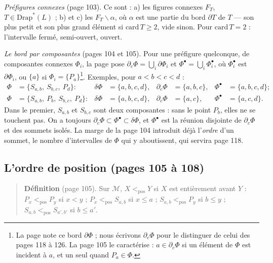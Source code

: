 \documentclass[11pt,a4paper]{article}
\begin{document}
\emph{Préfigures connexes} (page 103). Ce sont : a) les figures connexes
$F_{T}$, $T \in \mathrm{Drap}^{*}(L)$ ; b) et c) les $F_{T} \smallsetminus
\alpha$, où $\alpha$ est une partie du bord $\partial T$ de $T$ --- son plus
petit et son plus grand élément si $\mathrm{card}\, T \geq 2$, vide sinon.
Pour $\mathrm{card}\, T = 2$ : l'intervalle fermé, semi-ouvert, ouvert.

\emph{Le bord par composantes} (pages 104 et 105). Pour une préfigure
quelconque, de composantes connexes $\Phi_{i}$, la page pose $\partial_{c}\Phi
= \bigcup_{i} \partial\Phi_{i}$ et $\Phi^{\bullet} = \bigcup_{i}
\Phi_{i}^{\bullet}$, où $\Phi_{i}^{\bullet}$ est $\partial\Phi_{i}$, ou $\{a\}$
si $\Phi_{i} = \{P_{a}\}$\footnote{La page note ce bord $\partial\Phi$ ; nous
écrivons $\partial_{c}\Phi$ pour le distinguer de celui des pages 118 à 126.
La page 105 le caractérise : $a \in \partial_{c}\Phi$ si un élément de $\Phi$
est incident à $a$, et un seul quand $P_{a} \in \Phi$.}. Exemples, pour $a < b <
c < d$ :
\[
\begin{aligned}
\Phi &= \{S_{a,b},\ S_{b,c},\ P_{d}\} : & \delta\Phi &= \{a,b,c,d\}, &
\partial_{c}\Phi &= \{a,b,c\}, & \Phi^{\bullet} &= \{a,b,c,d\} ; \\
\Phi &= \{S_{a,b},\ P_{b},\ S_{b,c},\ P_{d}\} : & \delta\Phi &= \{a,b,c,d\}, &
\partial_{c}\Phi &= \{a,c\}, & \Phi^{\bullet} &= \{a,c,d\}.
\end{aligned}
\]
Dans le premier, $S_{a,b}$ et $S_{b,c}$ sont deux composantes : sans le point
$P_{b}$, elles ne se touchent pas. On a toujours $\partial_{c}\Phi \subset
\Phi^{\bullet} \subset \delta\Phi$, et $\Phi^{\bullet}$ est la réunion disjointe
de $\partial_{c}\Phi$ et des sommets isolés. La marge de la page 104 introduit
déjà l'\emph{ordre} d'un sommet, le nombre d'intervalles de $\Phi$ qui y
aboutissent, qui servira page 118.

\subsection*{L'ordre de position (pages 105 à 108)}

\begin{quote}
\textbf{Définition} (page 105). Sur $\mathcal{M}$, $X <_{\mathrm{pos}} Y$ si
$X$ est entièrement avant $Y$ : $P_{x} <_{\mathrm{pos}} P_{y}$ si $x < y$ ;
$P_{x} <_{\mathrm{pos}} S_{a,b}$ si $x \leq a$ ; $S_{a,b} <_{\mathrm{pos}}
P_{y}$ si $b \leq y$ ; $S_{a,b} <_{\mathrm{pos}} S_{a',b'}$ si $b \leq a'$.
\end{quote}
\end{document}

